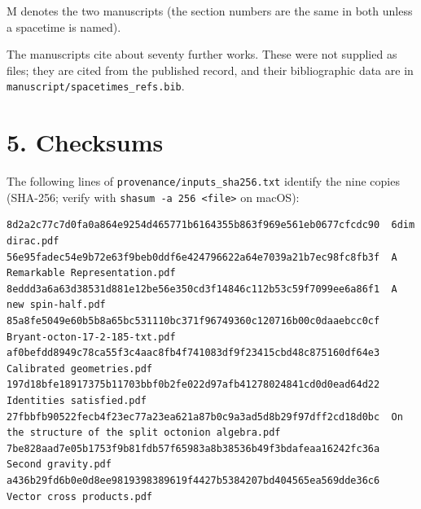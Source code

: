 \documentclass[
  10pt,
]{article}
\begin{document}
M denotes the two manuscripts (the section numbers are the same in both
unless a spacetime is named).

The manuscripts cite about seventy further works. These were not
supplied as files; they are cited from the published record, and their
bibliographic data are in \texttt{manuscript/spacetimes\_refs.bib}.

\hypertarget{checksums}{%
\section{5. Checksums}\label{checksums}}

The following lines of \texttt{provenance/inputs\_sha256.txt} identify
the nine copies (SHA-256; verify with
\texttt{shasum\ -a\ 256\ \textless{}file\textgreater{}} on macOS):

\begin{verbatim}
8d2a2c77c7d0fa0a864e9254d465771b6164355b863f969e561eb0677cfcdc90  6dim dirac.pdf
56e95fadec54e9b72e63f9beb0ddf6e424796622a64e7039a21b7ec98fc8fb3f  A Remarkable Representation.pdf
8eddd3a6a63d38531d881e12be56e350cd3f14846c112b53c59f7099ee6a86f1  A new spin-half.pdf
85a8fe5049e60b5b8a65bc531110bc371f96749360c120716b00c0daaebcc0cf  Bryant-octon-17-2-185-txt.pdf
af0befdd8949c78ca55f3c4aac8fb4f741083df9f23415cbd48c875160df64e3  Calibrated geometries.pdf
197d18bfe18917375b11703bbf0b2fe022d97afb41278024841cd0d0ead64d22  Identities satisfied.pdf
27fbbfb90522fecb4f23ec77a23ea621a87b0c9a3ad5d8b29f97dff2cd18d0bc  On the structure of the split octonion algebra.pdf
7be828aad7e05b1753f9b81fdb57f65983a8b38536b49f3bdafeaa16242fc36a  Second gravity.pdf
a436b29fd6b0e0d8ee9819398389619f4427b5384207bd404565ea569dde36c6  Vector cross products.pdf
\end{verbatim}
\end{document}
